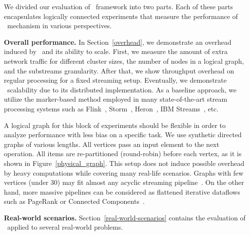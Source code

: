 We divided our evaluation of \tracker\ framework into two parts. Each of these parts encapsulates logically connected experiments that measure the performance of \tracker\ mechanism in various perspectives.

{\noindent \bf Overall performance.} In Section~\ref{overhead}, we demonstrate an overhead induced by \tracker\ and its ability to scale. First, we measure the amount of extra network traffic for different cluster sizes, the number of nodes in a logical graph, and the substreams granularity. After that, we show throughput overhead on regular processing for a fixed streaming setup. Eventually, we demonstrate \tracker\ scalability due to its distributed implementation. As a baseline approach, we utilize the marker-based method employed in many state-of-the-art stream processing systems such as Flink~\cite{Carbone:2017:SMA:3137765.3137777}, Storm~\cite{apache:storm:state}, Heron~\cite{Kulkarni:2015:THS:2723372.2742788}, IBM Streams~\cite{jacques2016consistent}, etc. 

A logical graph for this block of experiments should be flexible in order to analyze performance with less bias on a specific task. We use synthetic directed graphs of various lengths. All vertices pass an input element to the next operation. All items are re-partitioned (round-robin) before each vertex, as it is shown in Figure~\ref{physical_graph}. This setup does not induce possible overhead by heavy computations while covering many real-life scenarios. Graphs with few vertices (under 30) may fit almost any acyclic streaming pipeline~\cite{akidau2018streaming}. On the other hand, more massive pipelines can be considered as flattened iterative dataflows such as PageRank or Connected Components~\cite{Murray:2013:NTD:2517349.2522738, xu2016efficient}.

{\noindent \bf Real-world scenarios.} Section~\ref{real-world-scenarios} contains the evaluation of \tracker\ applied to several real-world problems. 



